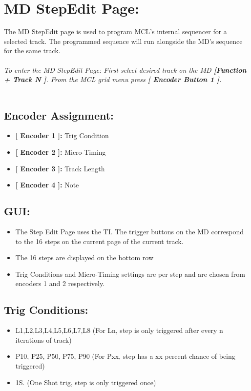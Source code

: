 \chapter{MD StepEdit Page:}

The MD StepEdit page is used to program MCL's internal sequencer for a selected track. The programmed sequence will run alongside the MD's sequence for the same track.\\
\\\textit{To enter the MD StepEdit Page: First select desired track on the MD \textbf{[Function + Track N ]}. From the MCL grid menu press \textbf{[ Encoder Button 1 ]}.}\\
\\
\section{Encoder Assignment:}
\begin{itemize}
	\item \textbf{[ Encoder 1 ]: } Trig Condition
	\item \textbf{[ Encoder 2 ]: } Micro-Timing
	\item \textbf{[ Encoder 3 ]: } Track Length
	\item \textbf{[ Encoder 4 ]: } Note
\end{itemize}
\section{GUI:}
\begin{itemize}
\item The Step Edit Page uses the TI. The trigger buttons on the MD correspond to the 16 steps on the current page of the current track.
\item The 16 steps are displayed on the bottom row
\item Trig Conditions and Micro-Timing settings are per step and are chosen from encoders 1 and 2 respectively.
\end{itemize}
\section{Trig Conditions:}
\begin{itemize}
\item L1,L2,L3,L4,L5,L6,L7,L8 (For Ln, step is only triggered after every n iterations of track)
\item P10, P25, P50, P75, P90 (For Pxx, step has a xx percent chance of being triggered)
\item 1S. (One Shot trig, step is only triggered once)
\end{itemize}
